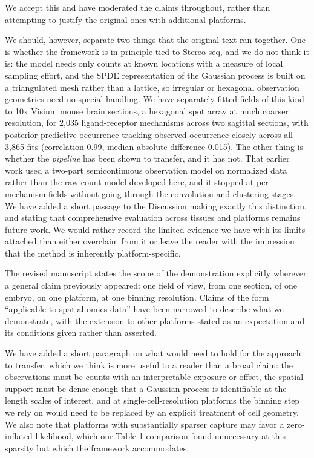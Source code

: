 \documentclass[11pt]{article}
\begin{document}
\noindent We accept this and have moderated the claims throughout, rather than attempting to
justify the original ones with additional platforms.

We should, however, separate two things that the original text ran together. One is whether
the framework is in principle tied to Stereo-seq, and we do not think it is: the model needs
only counts at known locations with a measure of local sampling effort, and the SPDE
representation of the Gaussian process is built on a triangulated mesh rather than a lattice,
so irregular or hexagonal observation geometries need no special handling. We have separately
fitted fields of this kind to 10x Visium mouse brain sections, a hexagonal spot array at much
coarser resolution, for 2,035 ligand-receptor mechanisms across two sagittal sections, with
posterior predictive occurrence tracking observed occurrence closely across all 3,865 fits
(correlation 0.99, median absolute difference 0.015). The other thing is whether the
\emph{pipeline} has been shown to transfer, and it has not. That earlier work used a two-part
semicontinuous observation model on normalized data rather than the raw-count model developed
here, and it stopped at per-mechanism fields without going through the convolution and
clustering stages. We have added a short passage to the Discussion making exactly this
distinction, and stating that comprehensive evaluation across tissues and platforms remains
future work. We would rather record the limited evidence we have with its limits attached
than either overclaim from it or leave the reader with the impression that the method is
inherently platform-specific.

The revised manuscript states the scope of the demonstration explicitly wherever a general
claim previously appeared: one field of view, from one section, of one embryo, on one
platform, at one binning resolution. Claims of the form ``applicable to spatial omics data''
have been narrowed to describe what we demonstrate, with the extension to other platforms
stated as an expectation and its conditions given rather than asserted.

We have added a short paragraph on what would need to hold for the approach to transfer,
which we think is more useful to a reader than a broad claim: the observations must be
counts with an interpretable exposure or offset, the spatial support must be dense enough
that a Gaussian process is identifiable at the length scales of interest, and at
single-cell-resolution platforms the binning step we rely on would need to be replaced by an
explicit treatment of cell geometry. We also note that platforms with substantially sparser
capture may favor a zero-inflated likelihood, which our Table 1 comparison found
unnecessary at this sparsity but which the framework accommodates.
\end{document}
